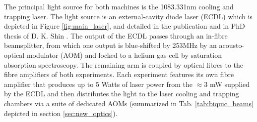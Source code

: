 	The principal light source for both machines is the 1083.331nm cooling and trapping laser.
	The light source is an external-cavity diode laser (ECDL) which is depicted in Figure \ref{fig:main_laser}, and detailed in the publication \cite{Shin16} and in PhD thesis of D. K. Shin \cite{ShinThesis}.
	The output of the ECDL passes through an in-fibre beamsplitter, from which one output is blue-shifted by 253MHz by an acousto-optical modulator (AOM) and locked to a helium gas cell by saturation absorption spectroscopy.
	The remaining arm is coupled by optical fibres to the fibre amplifiers of both experiments.
	Each experiment features its own fibre amplifier that produces up to 5 Watts of laser power from the $\approx$3 mW supplied by the ECDL and then distributes the light to the laser cooling and trapping chambers via a suite of dedicated AOMs (summarized in Tab. \ref{tab:biquic_beams} depicted in section \ref{sec:new_optics}).

	



